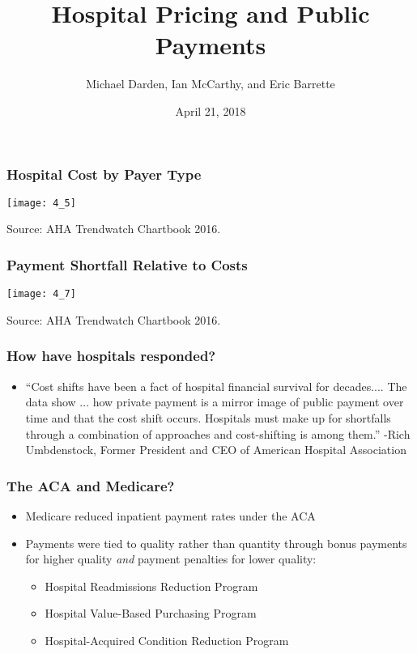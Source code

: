 \documentclass{beamer}
\title[Hospital Pricing and Public Payments]{Hospital Pricing and Public Payments} %
\author[Darden, McCarthy, Barrette]{Michael Darden, Ian McCarthy, and Eric Barrette} %
\institute[] %
{Midwest Health Economics Conference \\ %
\medskip
{Columbus, OH} 
}
\date{April 21, 2018} %
\begin{document}
\begin{frame}
\titlepage %
\end{frame}





\begin{frame}
\frametitle{Hospital Cost by Payer Type}
\begin{center}
\texttt{[image: 4\_5]}
\end{center}
\tiny Source: AHA Trendwatch Chartbook 2016.  
\end{frame}

\begin{frame}
\frametitle{Payment Shortfall Relative to Costs}
\begin{center}
\texttt{[image: 4\_7]}
\end{center}
\tiny Source: AHA Trendwatch Chartbook 2016.  
\end{frame}


\begin{frame}
\frametitle{How have hospitals responded?}
\begin{itemize}
\item ``Cost shifts have been a fact of hospital financial survival for decades.... The data show ...  how private payment is a mirror image of public payment over time and that the cost shift occurs. Hospitals must make up for shortfalls through a combination of approaches and cost-shifting is among them.'' -Rich Umbdenstock, Former President and CEO of American Hospital Association
\end{itemize}
\end{frame}

\begin{frame}
\frametitle{The ACA and Medicare?}
\begin{itemize}
\item Medicare reduced inpatient payment rates under the ACA
\item Payments were tied to quality rather than quantity through bonus payments for higher quality \textit{and} payment penalties for lower quality:
\begin{itemize}
\item Hospital Readmissions Reduction Program
\item Hospital Value-Based Purchasing Program
\item Hospital-Acquired Condition Reduction Program
\end{itemize}
\end{itemize}
\end{frame}
\end{document}

